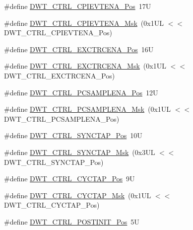 \begin{DoxyCompactItemize}
\item 
\#define \mbox{\hyperlink{group___c_m_s_i_s___d_w_t_ga9fff0b71fb0be1499f5180c6bce1fc8f}{D\+W\+T\+\_\+\+C\+T\+R\+L\+\_\+\+C\+P\+I\+E\+V\+T\+E\+N\+A\+\_\+\+Pos}}~17U
\item 
\#define \mbox{\hyperlink{group___c_m_s_i_s___d_w_t_ga189089c30aade60b983df17ad2412f6f}{D\+W\+T\+\_\+\+C\+T\+R\+L\+\_\+\+C\+P\+I\+E\+V\+T\+E\+N\+A\+\_\+\+Msk}}~(0x1\+U\+L $<$$<$ D\+W\+T\+\_\+\+C\+T\+R\+L\+\_\+\+C\+P\+I\+E\+V\+T\+E\+N\+A\+\_\+\+Pos)
\item 
\#define \mbox{\hyperlink{group___c_m_s_i_s___d_w_t_ga05f13b547a9a1e63e003ee0bc6446d0d}{D\+W\+T\+\_\+\+C\+T\+R\+L\+\_\+\+E\+X\+C\+T\+R\+C\+E\+N\+A\+\_\+\+Pos}}~16U
\item 
\#define \mbox{\hyperlink{group___c_m_s_i_s___d_w_t_gaf4fbb509ab3cbb768f16484c660a24c3}{D\+W\+T\+\_\+\+C\+T\+R\+L\+\_\+\+E\+X\+C\+T\+R\+C\+E\+N\+A\+\_\+\+Msk}}~(0x1\+U\+L $<$$<$ D\+W\+T\+\_\+\+C\+T\+R\+L\+\_\+\+E\+X\+C\+T\+R\+C\+E\+N\+A\+\_\+\+Pos)
\item 
\#define \mbox{\hyperlink{group___c_m_s_i_s___d_w_t_ga1e14afc7790fcb424fcf619e192554c9}{D\+W\+T\+\_\+\+C\+T\+R\+L\+\_\+\+P\+C\+S\+A\+M\+P\+L\+E\+N\+A\+\_\+\+Pos}}~12U
\item 
\#define \mbox{\hyperlink{group___c_m_s_i_s___d_w_t_gafdcf1c86f43fbeaf2780ce797c9ef3d6}{D\+W\+T\+\_\+\+C\+T\+R\+L\+\_\+\+P\+C\+S\+A\+M\+P\+L\+E\+N\+A\+\_\+\+Msk}}~(0x1\+U\+L $<$$<$ D\+W\+T\+\_\+\+C\+T\+R\+L\+\_\+\+P\+C\+S\+A\+M\+P\+L\+E\+N\+A\+\_\+\+Pos)
\item 
\#define \mbox{\hyperlink{group___c_m_s_i_s___d_w_t_ga678ef08786edcbef964479217efb9284}{D\+W\+T\+\_\+\+C\+T\+R\+L\+\_\+\+S\+Y\+N\+C\+T\+A\+P\+\_\+\+Pos}}~10U
\item 
\#define \mbox{\hyperlink{group___c_m_s_i_s___d_w_t_gaf1e6c3729d56ecadeb6eeff4d225968c}{D\+W\+T\+\_\+\+C\+T\+R\+L\+\_\+\+S\+Y\+N\+C\+T\+A\+P\+\_\+\+Msk}}~(0x3\+U\+L $<$$<$ D\+W\+T\+\_\+\+C\+T\+R\+L\+\_\+\+S\+Y\+N\+C\+T\+A\+P\+\_\+\+Pos)
\item 
\#define \mbox{\hyperlink{group___c_m_s_i_s___d_w_t_gaf70b80936c7db60bf84fb6dadb8a3559}{D\+W\+T\+\_\+\+C\+T\+R\+L\+\_\+\+C\+Y\+C\+T\+A\+P\+\_\+\+Pos}}~9U
\item 
\#define \mbox{\hyperlink{group___c_m_s_i_s___d_w_t_ga6c12e2868b8989a69445646698b8c331}{D\+W\+T\+\_\+\+C\+T\+R\+L\+\_\+\+C\+Y\+C\+T\+A\+P\+\_\+\+Msk}}~(0x1\+U\+L $<$$<$ D\+W\+T\+\_\+\+C\+T\+R\+L\+\_\+\+C\+Y\+C\+T\+A\+P\+\_\+\+Pos)
\item 
\#define \mbox{\hyperlink{group___c_m_s_i_s___d_w_t_ga2868c0b28eb13be930afb819f55f6f25}{D\+W\+T\+\_\+\+C\+T\+R\+L\+\_\+\+P\+O\+S\+T\+I\+N\+I\+T\+\_\+\+Pos}}~5U
$$
\end{DoxyCompactItemize}
